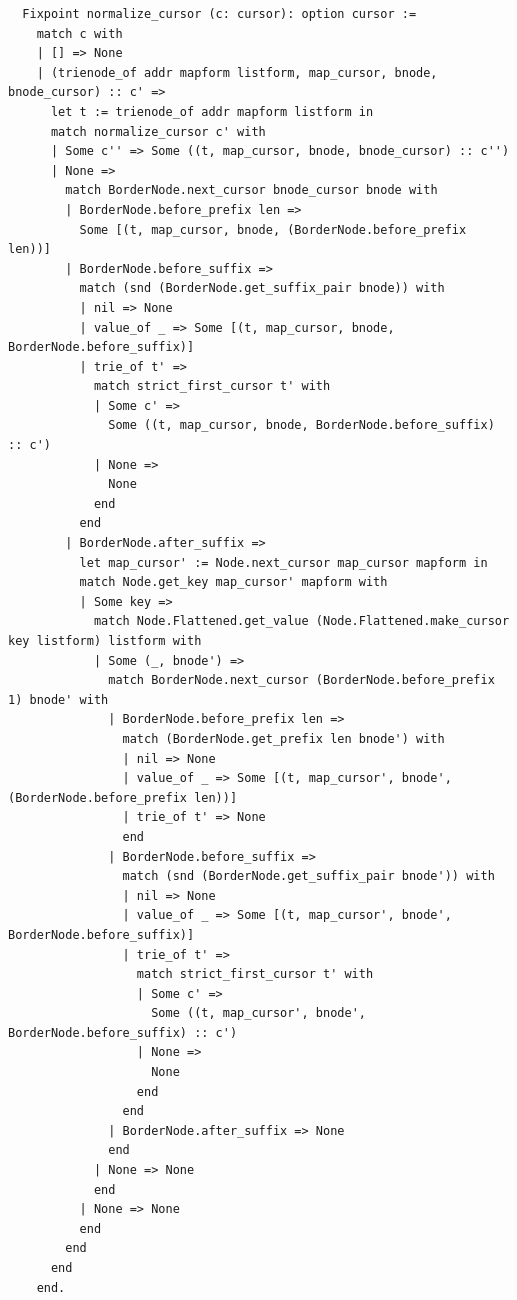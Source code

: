 \documentclass[runningheads]{llncs}
\begin{document}
\begin{verbatim}
  Fixpoint normalize_cursor (c: cursor): option cursor :=
    match c with
    | [] => None
    | (trienode_of addr mapform listform, map_cursor, bnode, bnode_cursor) :: c' =>
      let t := trienode_of addr mapform listform in
      match normalize_cursor c' with
      | Some c'' => Some ((t, map_cursor, bnode, bnode_cursor) :: c'')
      | None =>
        match BorderNode.next_cursor bnode_cursor bnode with
        | BorderNode.before_prefix len =>
          Some [(t, map_cursor, bnode, (BorderNode.before_prefix len))]
        | BorderNode.before_suffix =>
          match (snd (BorderNode.get_suffix_pair bnode)) with
          | nil => None
          | value_of _ => Some [(t, map_cursor, bnode, BorderNode.before_suffix)]
          | trie_of t' =>
            match strict_first_cursor t' with
            | Some c' =>
              Some ((t, map_cursor, bnode, BorderNode.before_suffix) :: c')
            | None =>
              None
            end
          end
        | BorderNode.after_suffix =>
          let map_cursor' := Node.next_cursor map_cursor mapform in
          match Node.get_key map_cursor' mapform with
          | Some key =>
            match Node.Flattened.get_value (Node.Flattened.make_cursor key listform) listform with
            | Some (_, bnode') =>
              match BorderNode.next_cursor (BorderNode.before_prefix 1) bnode' with
              | BorderNode.before_prefix len =>
                match (BorderNode.get_prefix len bnode') with
                | nil => None
                | value_of _ => Some [(t, map_cursor', bnode', (BorderNode.before_prefix len))]
                | trie_of t' => None
                end
              | BorderNode.before_suffix =>
                match (snd (BorderNode.get_suffix_pair bnode')) with
                | nil => None
                | value_of _ => Some [(t, map_cursor', bnode', BorderNode.before_suffix)]
                | trie_of t' =>
                  match strict_first_cursor t' with
                  | Some c' =>
                    Some ((t, map_cursor', bnode', BorderNode.before_suffix) :: c')
                  | None =>
                    None
                  end
                end
              | BorderNode.after_suffix => None
              end
            | None => None
            end
          | None => None
          end
        end
      end
    end.


\end{verbatim}
\end{document}

